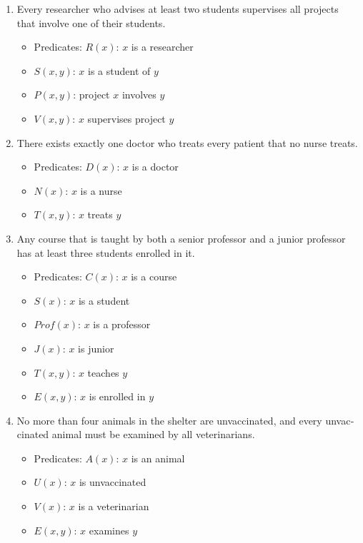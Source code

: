 \documentclass[a4paper,10pt]{article}
\begin{document}
\begin{latin}
\begin{enumerate}
	\item Every researcher who advises at least two students supervises all projects that involve one of their students.
	\begin{itemize}
		\item[] Predicates: $R(x)$: $x$ is a researcher
		\item[] $S(x,y)$: $x$ is a student of $y$
		\item[] $P(x,y)$: project $x$ involves $y$
		\item[] $V(x,y)$: $x$ supervises project $y$
	\end{itemize}
	
	\item There exists exactly one doctor who treats every patient that no nurse treats.
	\begin{itemize}
		\item[] Predicates: $D(x)$: $x$ is a doctor
		\item[] $N(x)$: $x$ is a nurse
		\item[] $T(x,y)$: $x$ treats $y$
	\end{itemize}
	
	\pagebreak
	
	\item Any course that is taught by both a senior professor and a junior professor has at least three students enrolled in it.
	\begin{itemize}
		\item[] Predicates: $C(x)$: $x$ is a course
		\item[] $S(x)$: $x$ is a student
		\item[] $Prof(x)$: $x$ is a professor
		\item[] $J(x)$: $x$ is junior
		\item[] $T(x,y)$: $x$ teaches $y$
		\item[] $E(x,y)$: $x$ is enrolled in $y$
	\end{itemize}
	
	\item No more than four animals in the shelter are unvaccinated, and every unvaccinated animal must be examined by all veterinarians.
	\begin{itemize}
		\item[] Predicates: $A(x)$: $x$ is an animal
		\item[] $U(x)$: $x$ is unvaccinated
		\item[] $V(x)$: $x$ is a veterinarian
		\item[] $E(x,y)$: $x$ examines $y$
	\end{itemize}
	

\end{enumerate}
\end{latin}
\end{document}
